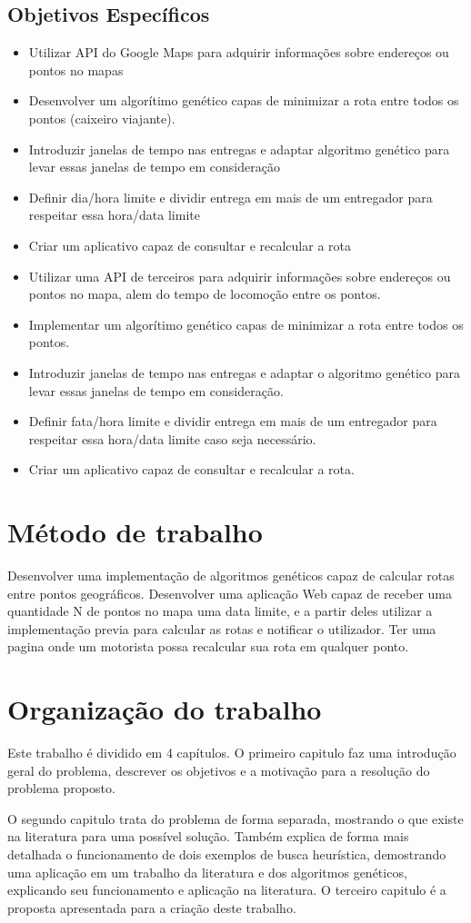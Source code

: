 \subsection{Objetivos Específicos}

\begin{itemize}
	\item Utilizar API do Google Maps para adquirir informações sobre endereços ou pontos no mapas
	\item Desenvolver um algorítimo genético capas de minimizar a rota entre todos os pontos (caixeiro viajante).
	\item Introduzir janelas de tempo nas entregas e adaptar algoritmo genético para levar essas janelas de tempo em consideração
	\item Definir dia/hora limite e dividir entrega em mais de um entregador para respeitar essa hora/data limite
	\item Criar um aplicativo capaz de consultar e recalcular a rota
	\item Utilizar uma API de terceiros para adquirir informações sobre endereços ou pontos no mapa, alem do tempo de locomoção entre os pontos.
	\item Implementar um algorítimo genético capas de minimizar a rota entre todos os pontos.
	\item Introduzir janelas de tempo nas entregas e adaptar o algoritmo genético para levar essas janelas de tempo em consideração.
	\item Definir fata/hora limite e dividir entrega em mais de um entregador para respeitar essa hora/data limite caso seja necessário.
	\item Criar um aplicativo capaz de consultar e recalcular a rota.
\end{itemize}

\section{Método de trabalho}

Desenvolver uma implementação de algoritmos genéticos capaz de calcular rotas entre pontos geográficos.
Desenvolver uma aplicação Web capaz de receber uma quantidade N de pontos no mapa uma data limite, e a partir deles utilizar a implementação previa para calcular as rotas e 
notificar o utilizador.
Ter uma pagina onde um motorista possa recalcular sua rota em qualquer ponto.

\section{Organização do trabalho}
Este trabalho é dividido em 4 capítulos. O primeiro capitulo faz uma introdução geral do problema, descrever os objetivos e a motivação para a resolução do problema proposto.

O segundo capitulo trata do problema de forma separada, mostrando o que existe na literatura para uma possível solução. Também explica de forma mais detalhada o funcionamento de dois exemplos de busca heurística, demostrando uma aplicação em um trabalho da literatura e dos algoritmos genéticos, explicando seu funcionamento e aplicação na literatura.
O terceiro capitulo é a proposta apresentada para a criação deste trabalho.

